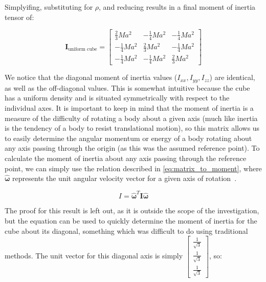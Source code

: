 Simplyifing, substituting for $\rho$, and reducing results in a final moment of inertia tensor of:

\[\bm{I}_{\text{uniform cube}} =  \begin{bmatrix} \frac{2}{3}Ma^2 & -\frac{1}{4}Ma^2 & -\frac{1}{4}Ma^2 \\ -\frac{1}{4}Ma^2 & \frac{2}{3}Ma^2 & -\frac{1}{4}Ma^2 \\ -\frac{1}{4}Ma^2 & -\frac{1}{4}Ma^2 & \frac{2}{3}Ma^2\end{bmatrix}\]

We notice that the diagonal moment of inertia values ($I_{xx}, I_{yy}, I_{zz}$) are identical, as well as the off-diagonal values. This is somewhat intuitive because the cube has a uniform density and is situated symmetrically with respect to the individual axes. It is important to keep in mind that the moment of inertia is a measure of the difficulty of rotating a body about a given axis (much like inertia is the tendency of a body to resist translational motion), so this matrix allows us to easily determine the angular momentum or energy of a body rotating about any axis passing through the origin (as this was the assumed reference point). To calculate the moment of inertia about any axis passing through the reference point, we can simply use the relation described in \cref{eq:matrix_to_moment}, where $\bm{\hat{\omega}}$ represents the unit angular velocity vector for a given axis of rotation~\parencite{Kreyszig_Kreyszig_Norminton_2011}. 

\begin{equation}
I = \bm{\hat{\omega}}^T\bm{I}\bm{\hat{\omega}}
\label{eq:matrix_to_moment}
\end{equation}

The proof for this result is left out, as it is outside the scope of the investigation, but the equation can be used to quickly determine the moment of inertia for the cube about its diagonal, something which was difficult to do using traditional methods. The unit vector for this diagonal axis is simply $\begin{bmatrix}\frac{1}{\sqrt{3}} \\ \frac{1}{\sqrt{3}} \\ \frac{1}{\sqrt{3}}\end{bmatrix}$, so:

